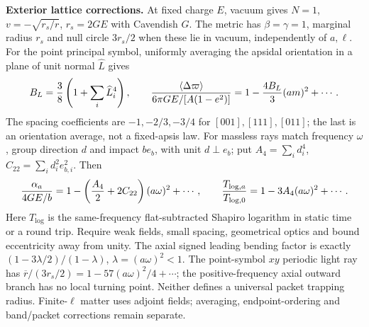 
\noindent\textbf{Exterior lattice corrections.}
At fixed charge $E$, vacuum gives $N=1$, $v=-\sqrt{r_s/r}$,
$r_s=2GE$ with Cavendish $G$. The metric has $\beta=\gamma=1$,
marginal radius $r_s$ and null circle $3r_s/2$ when these lie in vacuum,
independently of $a,\ell$.
For the point principal symbol, uniformly averaging the apsidal orientation
in a plane of unit normal $\widehat L$ gives
\[
 B_L={3\over8}\left(1+\sum_i\widehat L_i^4\right),\qquad
 {\langle\Delta\varpi\rangle\over6\pi GE/[A(1-e^2)]}
 =1-{4B_L\over3}(am)^2+\cdots .
\]
The spacing coefficients are $-1,-2/3,-3/4$ for $[001],[111],[011]$;
the last is an orientation average, not a fixed-apsis law.
For massless rays match frequency $\omega$, group direction $d$ and impact
$b e_b$, with unit $d\perp e_b$;
put $A_4=\sum_i d_i^4$, $C_{22}=\sum_i d_i^2e_{b,i}^2$. Then
\[
 {\alpha_a\over4GE/b}
 =1-\left({A_4\over2}+2C_{22}\right)(a\omega)^2+\cdots,
 \qquad {T_{\log,a}\over T_{\log,0}}=1-3A_4(a\omega)^2+\cdots .
\]
Here $T_{\log}$ is the same-frequency flat-subtracted Shapiro logarithm
in static time or a round trip. Require weak fields, small spacing,
geometrical optics and bound eccentricity away from unity.
The axial signed leading bending factor is exactly
$(1-3\lambda/2)/(1-\lambda)$, $\lambda=(a\omega)^2<1$.
The point-symbol $xy$ periodic light ray has
$\overline r/(3r_s/2)=1-57(a\omega)^2/4+\cdots$; the positive-frequency
axial outward branch has no local turning point. Neither defines a universal
packet trapping radius. Finite-$\ell$ matter uses adjoint fields;
averaging, endpoint-ordering and band/packet corrections remain separate.

